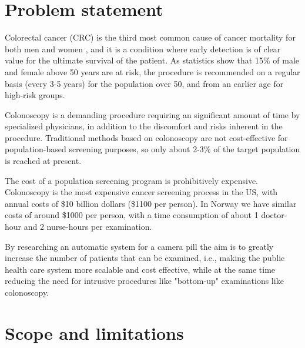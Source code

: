 \documentclass[thesis.tex]{subfiles}
\begin{document}
\section{Problem statement} \label{problem_statment}
Colorectal cancer (CRC) is the third most common cause of cancer mortality for both men and women \cite{CancerStatistics10}, and it is a condition where early detection is of clear value for the ultimate survival of the patient. As statistics show that 15\% of male and female above 50 years are at risk, the procedure is recommended on a regular basis (every 3-5 years) for the population over 50, and from an earlier age for high-risk groups. 

Colonoscopy is a demanding procedure requiring an significant amount of time by specialized physicians, in addition to the discomfort and risks inherent in the procedure. Traditional methods based on colonoscopy are not cost-effective for population-based screening purposes, so only about 2-3\% of the target population is reached at present. 

The cost of a population screening program is prohibitively expensive. Colonoscopy is the most expensive cancer screening process in the US, with annual costs of \$10 billion dollars (\$1100 per person). In Norway we have similar costs of around \$1000 per person, with a time consumption of about 1 doctor-hour and 2 nurse-hours per examination. 

By researching an automatic system for a camera pill the aim is to greatly increase the number of patients that can be examined, i.e., making the public health care system more scalable and cost effective, while at the same time reducing the need for intrusive procedures like "bottom-up" examinations like colonoscopy.


\section{Scope and limitations} \label{scope_and_limitations}

\end{document}
